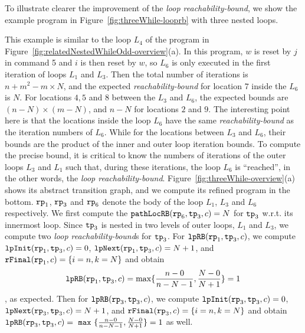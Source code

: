 To illustrate clearer the improvement of the \emph{loop reachability-bound},
we show the example program in Figure~\ref{fig:threeWhile-looprb} with three nested loops.

This example is similar to the loop $L_4$ of the program in Figure~\ref{fig:relatedNestedWhileOdd-overview}(a).
In this program, $w$ is reset by $j$ in command 5 and $i$ is then reset by $w$, so $L_6$ is only executed in the first iteration of loops $L_1$ and $L_3$.
Then the total number of iterations is
$n + m^2 - m \times N$,
and the expected \emph{reachability-bound} for location $7$ inside the $L_6$ is $N$.
For locations $4, 5$ and $8$ between the $L_3$ and $L_6$,
the expected bounds are $(n-N) \times (m - N)$,
and $n - N$ for locations $2$ and $9$.
The interesting point here is that the locations inside the loop $L_6$ have the same
\emph{reachability-bound} as the iteration numbers of $L_6$.
While for the locations between $L_3$ and $L_6$, their bounds are the product of the inner and outer loop iteration bounds.
To compute the precise bound, it is critical to know
the numbers of iterations of the outer loops $L_3$ and $L_1$ such that,
during these iterations, the loop $L_6$ is ``reached'',
in the other words, the \emph{loop reachability-bound}.
Figure~\ref{fig:threeWhile-overview}(a) shows its abstract transition graph,
and we compute its refined program in the bottom. 
$\mathtt{rp}_1$, $\mathtt{rp}_3$ and $\mathtt{rp}_6$ denote the body of the loop $L_1$, $L_3$ and $L_6$ respectively.
We first compute the $\mathtt{pathLocRB}(\mathtt{rp}_6, \mathtt{tp}_3, c) = N $ for $\mathtt{tp}_3$ w.r.t. its innermost loop.
Since $\mathtt{tp}_3$ is nested in two levels of outer loops, $L_1$ and $L_3$,
we compute two \emph{loop reachability-bound}s for $\mathtt{tp}_3$.
For $\mathtt{lpRB}(\mathtt{rp}_1, \mathtt{tp}_3, c)$,
we compute $\mathtt{lpInit}( \mathtt{rp}_1, \mathtt{tp}_3, c) = 0$,
$\mathtt{lpNext}( \mathtt{rp}_1, \mathtt{tp}_3, c) = N + 1 $, and
$\mathtt{rFinal}(\mathtt{rp}_1, c) = \{ i = n, k = N \}$ and obtain
$$ \mathtt{lpRB}(\mathtt{rp}_1, \mathtt{tp}_3, c) = \max\{ \frac{n - 0}{n - N - 1}, \frac{N - 0}{N + 1} \} = 1 $$, as expected.
Then for $\mathtt{lpRB}(\mathtt{rp}_3, \mathtt{tp}_3, c)$,
we compute $\mathtt{lpInit}( \mathtt{rp}_3, \mathtt{tp}_3, c) = 0$,
$\mathtt{lpNext}( \mathtt{rp}_3, \mathtt{tp}_3, c) = N + 1 $, and
$\mathtt{rFinal}(\mathtt{rp}_3, c) = \{ i = n, k = N \}$ and obtain
$\mathtt{lpRB}(\mathtt{rp}_3, \mathtt{tp}_3, c) = ~\mathtt{max}~\{ \frac{n - 0}{n - N - 1}, \frac{N - 0}{N + 1}\} = 1$ as well.

